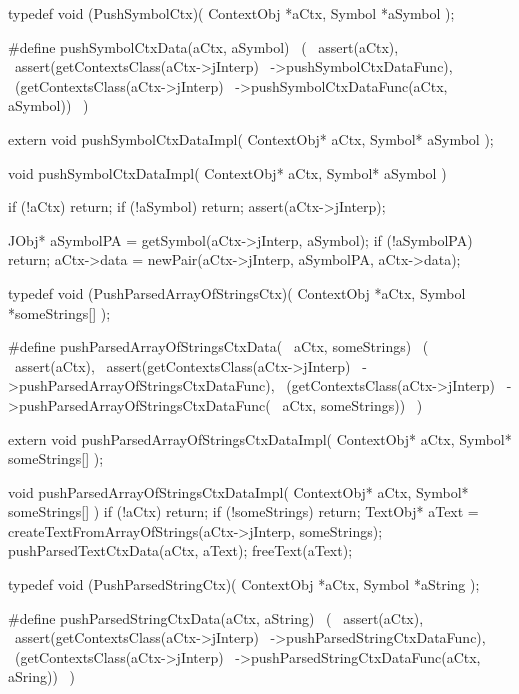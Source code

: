 \startCHeader
typedef void (PushSymbolCtx)(
  ContextObj *aCtx,
  Symbol     *aSymbol
);

#define pushSymbolCtxData(aCtx, aSymbol)      \
  (                                           \
    assert(aCtx),                             \
    assert(getContextsClass(aCtx->jInterp)    \
      ->pushSymbolCtxDataFunc),               \
    (getContextsClass(aCtx->jInterp)          \
      ->pushSymbolCtxDataFunc(aCtx, aSymbol)) \
  )
\stopCHeader

\setCHeaderStream{private}
\startCHeader
extern void pushSymbolCtxDataImpl(
  ContextObj* aCtx,
  Symbol* aSymbol
);
\stopCHeader
\setCHeaderStream{public}

\startCCode
void pushSymbolCtxDataImpl(
  ContextObj* aCtx,
  Symbol* aSymbol
) {
  if (!aCtx) return;
  if (!aSymbol) return;
  assert(aCtx->jInterp);

  JObj* aSymbolPA =
    getSymbol(aCtx->jInterp, aSymbol);
  if (!aSymbolPA) return;
  aCtx->data = newPair(aCtx->jInterp, aSymbolPA, aCtx->data);
}
\stopCCode

\startCHeader
typedef void (PushParsedArrayOfStringsCtx)(
  ContextObj *aCtx,
  Symbol     *someStrings[]
);

#define pushParsedArrayOfStringsCtxData(      \
  aCtx, someStrings)                          \
  (                                           \
    assert(aCtx),                             \
    assert(getContextsClass(aCtx->jInterp)    \
      ->pushParsedArrayOfStringsCtxDataFunc), \
    (getContextsClass(aCtx->jInterp)          \
      ->pushParsedArrayOfStringsCtxDataFunc(  \
        aCtx, someStrings))                   \
  )
\stopCHeader

\startCHeader
extern void pushParsedArrayOfStringsCtxDataImpl(
  ContextObj* aCtx,
  Symbol* someStrings[]
);
\stopCHeader
\setCHeaderStream{public}

\startCCode
void pushParsedArrayOfStringsCtxDataImpl(
  ContextObj* aCtx,
  Symbol* someStrings[]
) {
  if (!aCtx) return;
  if (!someStrings) return;
  TextObj* aText =
    createTextFromArrayOfStrings(aCtx->jInterp, someStrings);
  pushParsedTextCtxData(aCtx, aText);
  freeText(aText);
}
\stopCCode

\startCHeader
typedef void (PushParsedStringCtx)(
  ContextObj *aCtx,
  Symbol     *aString
);

#define pushParsedStringCtxData(aCtx, aString)      \
  (                                                 \
    assert(aCtx),                                   \
    assert(getContextsClass(aCtx->jInterp)          \
      ->pushParsedStringCtxDataFunc),               \
    (getContextsClass(aCtx->jInterp)                \
      ->pushParsedStringCtxDataFunc(aCtx, aSring))  \
  )
\stopCHeader

